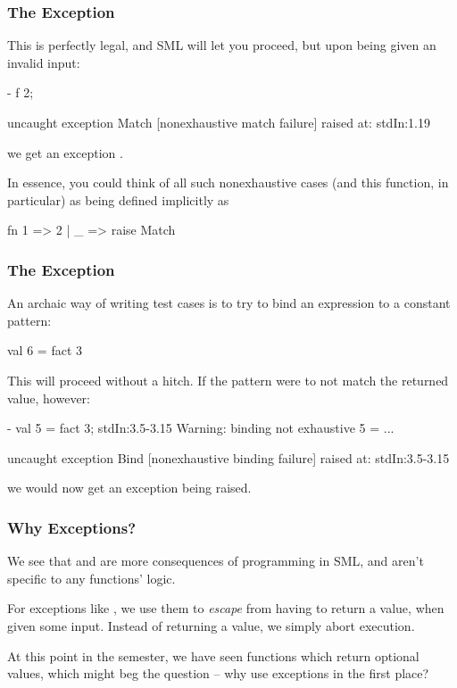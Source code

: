 \documentclass[aspectratio=169, handout]{beamer}
\begin{document}
\begin{frame}[fragile]
  \frametitle{The  Exception}

  This is perfectly legal, and SML will let you proceed, but upon being given
  an invalid input:
  \pause
  \begin{codeblock}
    - f 2;

    uncaught exception Match [nonexhaustive match failure]
      raised at: stdIn:1.19
  \end{codeblock}
  we get an exception .

  \pause
  \vspace{\fill}

  In essence, you could think of all such nonexhaustive cases (and this function,
  in particular) as being defined implicitly as
  \pause
  \begin{codeblock}
    fn 1 => 2 | _ => raise Match
  \end{codeblock}
\end{frame}

\begin{frame}[fragile]
  \frametitle{The  Exception}

  An archaic way of writing test cases is to try to bind an expression to a
  constant pattern:
  \begin{codeblock}
    val 6 = fact 3
  \end{codeblock}

  \pause
  \vspace{\fill}

  This will proceed without a hitch. If the pattern were to not match the
  returned value, however:

  \begin{codeblock}
    - val 5 = fact 3;
    stdIn:3.5-3.15 Warning: binding not exhaustive
              5 = ...

    uncaught exception Bind [nonexhaustive binding failure]
      raised at: stdIn:3.5-3.15
  \end{codeblock}

  we would now get an exception  being raised.
\end{frame}

\begin{frame}[fragile]
  \frametitle{Why Exceptions?}

  We see that  and  are more consequences
  of programming in SML, and aren't specific to any functions' logic.

  \pause
  \vspace{\fill}

  For exceptions like , we use them to \textit{escape} from
  having to return a value, when given some input. Instead of returning
  a value, we simply abort execution.

  \pause
  \vspace{\fill}

  At this point in the semester, we have seen functions which return
  optional values, which might beg the question -- why use exceptions
  in the first place?
\end{frame}
\end{document}
